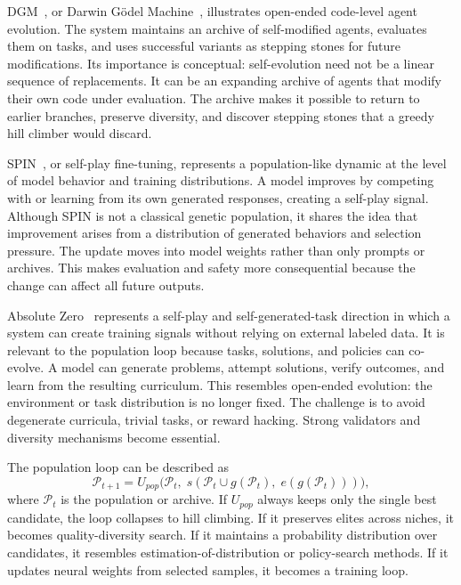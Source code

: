 DGM~\cite{darwingodelmachine2025}, or Darwin G\"{o}del Machine~\cite{schmidhuber2003}, illustrates open-ended code-level agent evolution.  The system maintains an archive of self-modified agents, evaluates them on tasks, and uses successful variants as stepping stones for future modifications.  Its importance is conceptual: self-evolution need not be a linear sequence of replacements.  It can be an expanding archive of agents that modify their own code under evaluation.  The archive makes it possible to return to earlier branches, preserve diversity, and discover stepping stones that a greedy hill climber would discard.

SPIN~\cite{spin2024}, or self-play fine-tuning, represents a population-like dynamic at the level of model behavior and training distributions.  A model improves by competing with or learning from its own generated responses, creating a self-play signal.  Although SPIN is not a classical genetic population, it shares the idea that improvement arises from a distribution of generated behaviors and selection pressure.  The update moves into model weights rather than only prompts or archives.  This makes evaluation and safety more consequential because the change can affect all future outputs.

Absolute Zero~\cite{absolutezero2025} represents a self-play and self-generated-task direction in which a system can create training signals without relying on external labeled data.  It is relevant to the population loop because tasks, solutions, and policies can co-evolve.  A model can generate problems, attempt solutions, verify outcomes, and learn from the resulting curriculum.  This resembles open-ended evolution: the environment or task distribution is no longer fixed.  The challenge is to avoid degenerate curricula, trivial tasks, or reward hacking.  Strong validators and diversity mechanisms become essential.

The population loop can be described as
\begin{equation}
  \mathcal{P}_{t+1} = U_{pop}\bigl(\mathcal{P}_t,\; s(\mathcal{P}_t \cup g(\mathcal{P}_t),\; e(g(\mathcal{P}_t)))\bigr),
  \label{eq:population-update}
\end{equation}
where $\mathcal{P}_t$ is the population or archive.  If $U_{pop}$ always keeps only the single best candidate, the loop collapses to hill climbing.  If it preserves elites across niches, it becomes quality-diversity search.  If it maintains a probability distribution over candidates, it resembles estimation-of-distribution or policy-search methods.  If it updates neural weights from selected samples, it becomes a training loop.

